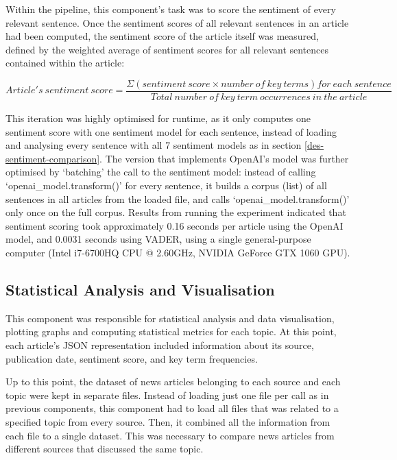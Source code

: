 \documentclass{report}
\begin{document}
Within the pipeline, this component's task was to score the sentiment of every relevant sentence.
Once the sentiment scores of all relevant sentences in an article had been computed, the sentiment score of the article itself was measured, defined by the weighted average of sentiment scores for all relevant sentences contained within the article:

\begin{center}
	$Article's \ sentiment \ score = \dfrac{\Sigma (sentiment \ score \times number \ of \ key \ terms) for \ each \ sentence}{Total \ number \ of \ key \ term \ occurrences \ in \ the \ article}$
\end{center}

This iteration was highly optimised for runtime, as it only computes one sentiment score with one sentiment model for each sentence, instead of loading and analysing every sentence with all 7 sentiment models as in section \ref{des-sentiment-comparison}.
The version that implements OpenAI's model was further optimised by `batching' the call to the sentiment model: 
instead of calling `openai\_model.transform()' for every sentence, it builds a corpus (list) of all sentences in all articles from the loaded file, and calls `openai\_model.transform()' only once on the full corpus.
Results from running the experiment indicated that sentiment scoring took approximately 0.16 seconds per article using the OpenAI model, and 0.0031 seconds using VADER, using a single general-purpose computer (Intel i7-6700HQ CPU @ 2.60GHz, NVIDIA GeForce GTX 1060 GPU).

\subsection{Statistical Analysis and Visualisation} \label{des-visualisation}

This component was responsible for statistical analysis and data visualisation, plotting graphs and computing statistical metrics for each topic.
At this point, each article's JSON representation included information about its source, publication date, sentiment score, and key term frequencies.

Up to this point, the dataset of news articles belonging to each source and each topic were kept in separate files.
Instead of loading just one file per call as in previous components, this component had to load all files that was related to a specified topic from every source.
Then, it combined all the information from each file to a single dataset.
This was necessary to compare news articles from different sources that discussed the same topic.
\end{document}
